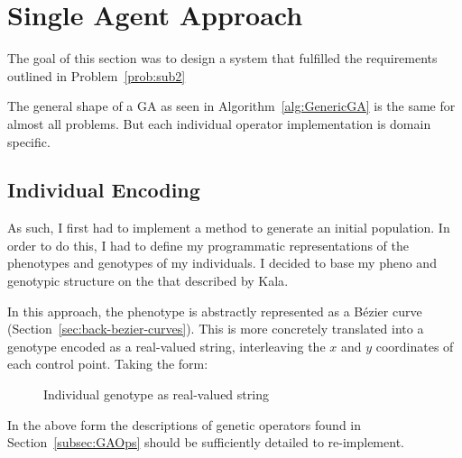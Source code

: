 
\section{Single Agent Approach}

The goal of this section was to design a system that fulfilled the requirements outlined in Problem~\ref{prob:sub2}

The general shape of a GA as seen in Algorithm~\ref{alg:GenericGA} is the same for almost all problems. But each individual operator implementation is domain specific.

\subsection{Individual Encoding}
As such, I first had to implement a method to generate an initial population. In order to do this, I had to define my programmatic representations of the phenotypes and genotypes of my individuals. I decided to base my pheno and genotypic structure on the that described by Kala\cite{kalaOnroadIntelligentVehicles2016}.

In this approach, the phenotype is abstractly represented as a Bézier curve (Section~\ref{sec:back-bezier-curves}). This is more concretely translated into a genotype encoded as a real-valued string, interleaving the $x$ and $y$ coordinates of each control point. Taking the form:

\begin{figure}[ht]
	\centering
	\caption{\label{fig:GA_Genotype} Individual genotype as real-valued string }
\end{figure}

In the above form the descriptions of genetic operators found in Section~\ref{subsec:GAOps} should be sufficiently detailed to re-implement.

